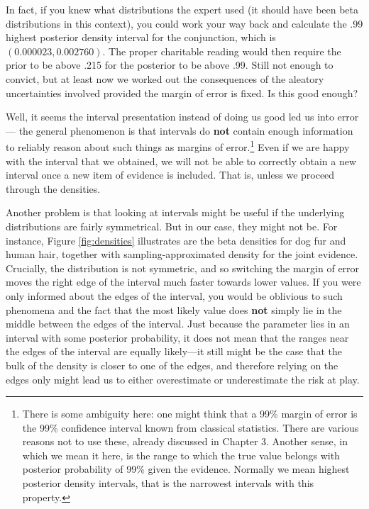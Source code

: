 \documentclass[
  10pt,
  dvipsnames,enabledeprecatedfontcommands]{scrartcl}
\begin{document}
In fact, if you knew what distributions the expert used (it should have
been beta distributions in this context), you could work your way back
and calculate the .99 highest posterior density interval for the
conjunction, which is \((0.000023, 0.002760)\). The proper charitable
reading would then require the prior to be above .215 for the posterior
to be above .99. Still not enough to convict, but at least now we worked
out the consequences of the aleatory uncertainties involved provided the
margin of error is fixed. Is this good enough?

Well, it seems the interval presentation instead of doing us good led us
into error --- the general phenomenon is that intervals do \textbf{not}
contain enough information to reliably reason about such things as
margins of error.\footnote{There is some ambiguity here: one might think
  that a 99\% margin of error is the 99\% confidence interval known from
  classical statistics. There are various reasons not to use these,
  already discussed in Chapter 3. Another sense, in which we mean it
  here, is the range to which the true value belongs with posterior
  probability of 99\% given the evidence. Normally we mean highest
  posterior density intervals, that is the narrowest intervals with this
  property.} Even if we are happy with the interval that we obtained, we
will not be able to correctly obtain a new interval once a new item of
evidence is included. That is, unless we proceed through the densities.

Another problem is that looking at intervals might be useful if the
underlying distributions are fairly symmetrical. But in our case, they
might not be. For instance, Figure \ref{fig:densities} illustrates are
the beta densities for dog fur and human hair, together with
sampling-approximated density for the joint evidence. Crucially, the
distribution is not symmetric, and so switching the margin of error
moves the right edge of the interval much faster towards lower values.
If you were only informed about the edges of the interval, you would be
oblivious to such phenomena and the fact that the most likely value does
\textbf{not} simply lie in the middle between the edges of the interval.
Just because the parameter lies in an interval with some posterior
probability, it does not mean that the ranges near the edges of the
interval are equally likely---it still might be the case that the bulk
of the density is closer to one of the edges, and therefore relying on
the edges only might lead us to either overestimate or underestimate the
risk at play.
\end{document}
